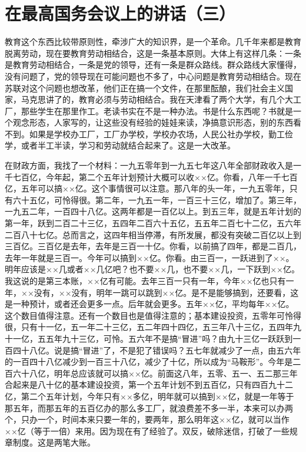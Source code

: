 \section[在最高国务会议上的讲话（三）（一九五八年九月九日）]{在最高国务会议上的讲话（三）}


教育这个东西比较带原则性，牵涉广大的知识界，是一个革命。几千年来都是教育脱离劳动，现在要教育劳动相结合，这是一条基本原则。大体上有这样几条：一条是教育劳动相结合，一条是党的领导，还有一条是群众路线。群众路线大家懂得，没有问题了，党的领导现在可能问题也不多了，中心问题是教育劳动相结合。现在苏联对这个问题也想改革，他们正在搞一个文件，在那里酝酿，我们社会主义国家，马克思讲了的，教育必须与劳动相结合。我在天津看了两个大学，有几个大工厂，那些学生在那里作工。老读书实在不是一种办法。书是什么东西呢？书就是一个观念形态，人家写的，让这些没有经验的娃娃来读，净搞意识形态，别的东西看不到。如果是学校办工厂，工厂办学校，学校办农场，人民公社办学校，勤工俭学，或者半工半读，学习和劳动就结合起来了。这是一大改革。

在财政方面，我找了一个材料：一九五零年到一九五七年这八年全部财政收入是一千七百亿，今年起，第二个五年计划预计大概可以收××亿。你看，八年一千七百亿，五年可以搞××亿。这个事情很可以注意。那八年的头一年，一九五零年，只有六十五亿，可怜得很。第二年，一九五一年，一百三十三亿，增加了。第三年，一九五二年，一百四十八亿。这两年都是一百亿以上。到五三年，就是五年计划的第一年，跃到二百二十三亿，五四年二百六十五亿，五五年二百七十二亿，五六年二百八十七亿。总而言之，这四年相当停滞，有所发展，都没有突破二百亿以上到三百亿。三百亿是去年，去年是三百一十亿。你看，以前搞了四年，都是二百几，去年一年就是三百一。今年可以搞到××亿。你看。由三百一，一跃进到了××。明年应该是××几或者××几亿吧？也不要××几，也不要××几，一下跃到××亿。我这说的是第三本账，××亿有可能。去年三百一只有一年，今年××亿也只有一年，××没有，××没有，明年一跳可以跳到××亿。是不是能够搞到，还要看，这是一种预计，或者还会更多一点。后年就会更多。五年××亿，平均每年××亿。这个数目值得注意。还有一个数目也是值得注意的；基本建设投资，五零年可怜得很，只有十一亿，五一年二十三亿，五二年四十四亿，五三年八十三亿，五四年九十一亿，五五年九十三亿，可怜。五六年不是搞“冒进”吗？由九十三亿一跃跃到一百四十八亿。说是搞“冒进”了，不是犯了错误吗？五七年就减少了一点，由五六年的一百四十八亿减少到一百三十八亿，减少了十亿，所以成为“马鞍形”。今年是二百六十八亿，明年总应该就可以搞××亿。前面这八年，五零、五一、五二那三年合起来是八十亿的基本建设投资，第一个五年计划不到五百亿，只有四百九十二亿，第二个五年计划，今年只有××多亿，明年就可以搞到××亿，就是一年等于那五年，而那五年的五百亿办的那么多工厂，就浪费差不多一半，本来可以办两个，只办一个，时间本来只要一年的，要两年，那么明年这××亿，就可以当作××亿（等于一倍）来用。因为现在有了经验了。双反，破除迷信，打破了一些规章制度。这是两笔大账。


